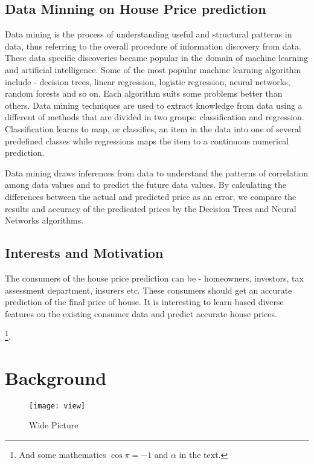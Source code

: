 \documentclass[fleqn,10pt]{SelfArx} %
\begin{document}
\subsection{Data Minning on House Price prediction}
Data mining is the process of understanding useful and structural patterns in data, thus referring to the overall procedure of information discovery from data. These data specific discoveries became popular in the domain of machine learning and artificial intelligence. Some of the most popular machine learning algorithm include - decision trees, linear regression, logistic regression, neural networks, random forests and so on. Each algorithm suits some problems better than others. Data mining techniques are used to extract knowledge from data using a different of methods that are divided in two groups: classification and regression. Classification learns to map, or classifies, an item in the data into one of several predefined classes while regressions maps the item to a continuous numerical prediction.

Data mining draws inferences from data to understand the patterns of correlation among data values and to predict the future data values. By calculating the differences between the actual and predicted price as an error, we compare the results and accuracy of the predicated prices by the Decision Trees and Neural Networks algorithms. 

\subsection{Interests and Motivation}
The consumers of the house price prediction can be - homeowners, investors, tax assessment department, insurers etc. These consumers should get an accurate prediction of the final price of house. It is interesting to learn based diverse features on the existing consumer data and predict accurate house prices.  

\footnote{And some mathematics $\cos\pi=-1$ and $\alpha$ in the text.}.


\section{Background}

\begin{figure*}[ht]\centering %
\texttt{[image: view]}
\caption{Wide Picture}
\label{fig:view}
\end{figure*}
\end{document}
